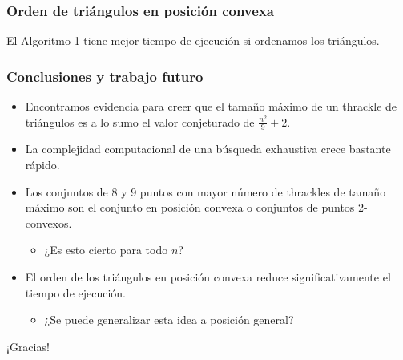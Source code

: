 \documentclass{beamer}
\begin{document}
\begin{frame}
  \frametitle{Orden de triángulos en posición convexa}
  El Algoritmo 1 tiene mejor tiempo de ejecución si ordenamos los triángulos.
  \begin{figure}[htb]
    \centering
    
  \end{figure}
\end{frame}

\begin{frame}
  \frametitle{Conclusiones y trabajo futuro}
  \begin{itemize}
    \item Encontramos evidencia para creer que el tamaño máximo de un thrackle
      de triángulos es a lo sumo el valor conjeturado de $\frac{n^2}{9}+2$.
    \item La complejidad computacional de una búsqueda exhaustiva crece bastante
      rápido.
    \item Los conjuntos de 8 y 9 puntos con mayor número de thrackles de tamaño
      máximo son el conjunto en posición convexa o conjuntos de puntos
      2-convexos.
      \begin{itemize}
        \item ¿Es esto cierto para todo $n$?
      \end{itemize}
    \item El orden de los triángulos en posición convexa reduce
      significativamente el tiempo de ejecución.
      \begin{itemize}
        \item ¿Se puede generalizar esta idea a posición general?
      \end{itemize}
  \end{itemize}
\end{frame}

\begin{frame}[c]
  \begin{center}
    \Huge ¡Gracias!
  \end{center}
\end{frame}
\end{document}
